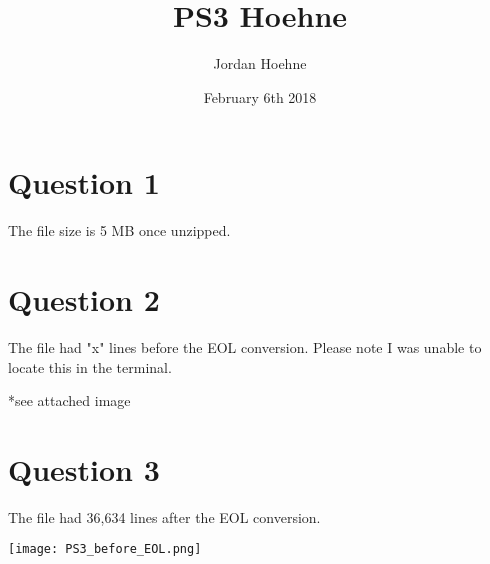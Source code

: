 \documentclass{article}
\title{PS3 Hoehne}
\author{Jordan Hoehne }
\date{February 6th 2018}
\begin{document}
\maketitle

\section{Question 1}
The file size is 5 MB once unzipped.

\section{Question 2}
The file had "x" lines before the EOL conversion. Please note I was unable to locate this in the terminal.

*see attached image

\section{Question 3}
The file had 36,634 lines after the EOL conversion.



\texttt{[image: PS3\_before\_EOL.png]}

\centering
\end{document}
